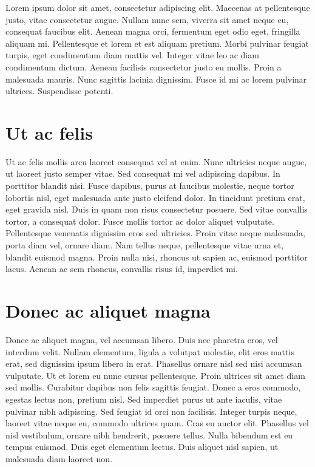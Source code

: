 \documentclass[a4paper,12pt,notitlepage,twoside]{article}
\begin{document}
  Lorem ipsum dolor sit amet, consectetur adipiscing elit. Maecenas at pellentesque justo, vitae consectetur augue. Nullam nunc sem, viverra sit amet neque eu, consequat faucibus elit. Aenean magna orci, fermentum eget odio eget, fringilla aliquam mi. Pellentesque et lorem et est aliquam pretium. Morbi pulvinar feugiat turpis, eget condimentum diam mattis vel. Integer vitae leo ac diam condimentum dictum. Aenean facilisis consectetur justo eu mollis. Proin a malesuada mauris. Nunc sagittis lacinia dignissim. Fusce id mi ac lorem pulvinar ultrices. Suspendisse potenti.
  
  \section{Ut ac felis}
  
  Ut ac felis mollis arcu laoreet consequat vel at enim. Nunc ultricies neque augue, ut laoreet justo semper vitae. Sed consequat mi vel adipiscing dapibus. In porttitor blandit nisi. Fusce dapibus, purus at faucibus molestie, neque tortor lobortis nisl, eget malesuada ante justo eleifend dolor. In tincidunt pretium erat, eget gravida nisl. Duis in quam non risus consectetur posuere. Sed vitae convallis tortor, a consequat dolor. Fusce mollis tortor ac dolor aliquet vulputate. Pellentesque venenatis dignissim eros sed ultricies. Proin vitae neque malesuada, porta diam vel, ornare diam. Nam tellus neque, pellentesque vitae urna et, blandit euismod magna. Proin nulla nisi, rhoncus ut sapien ac, euismod porttitor lacus. Aenean ac sem rhoncus, convallis risus id, imperdiet mi.
  
  \section{Donec ac aliquet magna}
  
  Donec ac aliquet magna, vel accumsan libero. Duis nec pharetra eros, vel interdum velit. Nullam elementum, ligula a volutpat molestie, elit eros mattis erat, sed dignissim ipsum libero in erat. Phasellus ornare nisl sed nisi accumsan vulputate. Ut et lorem eu nunc cursus pellentesque. Proin ultrices sit amet diam sed mollis. Curabitur dapibus non felis sagittis feugiat. Donec a eros commodo, egestas lectus non, pretium nisl. Sed imperdiet purus ut ante iaculis, vitae pulvinar nibh adipiscing. Sed feugiat id orci non facilisis. Integer turpis neque, laoreet vitae neque eu, commodo ultrices quam. Cras eu auctor elit. Phasellus vel nisl vestibulum, ornare nibh hendrerit, posuere tellus. Nulla bibendum est eu tempus euismod. Duis eget elementum lectus. Duis aliquet nisl sapien, ut malesuada diam laoreet non.
  
\end{document}
